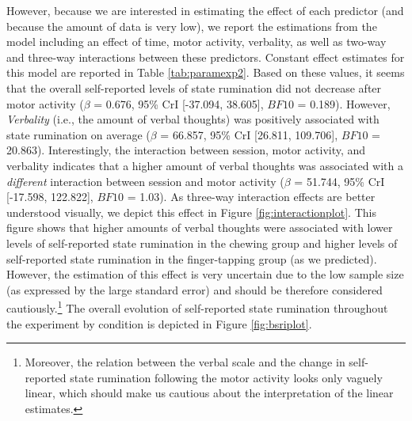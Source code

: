 \documentclass[a4paper,12pt,twoside,openright,oldfontcommands]{memoir}
\let\rmarkdownfootnote\footnote%
\def\footnote{\protect\rmarkdownfootnote}
\begin{document}
However, because we are interested in estimating the effect of each predictor (and because the amount of data is very low), we report the estimations from the model including an effect of time, motor activity, verbality, as well as two-way and three-way interactions between these predictors. Constant effect estimates for this model are reported in Table \ref{tab:paramexp2}. Based on these values, it seems that the overall self-reported levels of state rumination did not decrease after motor activity (\(\beta\) = 0.676, 95\% CrI {[}-37.094, 38.605{]}, \(BF10\) = 0.189). However, \emph{Verbality} (i.e., the amount of verbal thoughts) was positively associated with state rumination on average (\(\beta\) = 66.857, 95\% CrI {[}26.811, 109.706{]}, \(BF10\) = 20.863). Interestingly, the interaction between session, motor activity, and verbality indicates that a higher amount of verbal thoughts was associated with a \emph{different} interaction between session and motor activity (\(\beta\) = 51.744, 95\% CrI {[}-17.598, 122.822{]}, \(BF10\) = 1.03). As three-way interaction effects are better understood visually, we depict this effect in Figure \ref{fig:interactionplot}. This figure shows that higher amounts of verbal thoughts were associated with lower levels of self-reported state rumination in the chewing group and higher levels of self-reported state rumination in the finger-tapping group (as we predicted). However, the estimation of this effect is very uncertain due to the low sample size (as expressed by the large standard error) and should be therefore considered cautiously.\footnote{Moreover, the relation between the verbal scale and the change in self-reported state rumination following the motor activity looks only vaguely linear, which should make us cautious about the interpretation of the linear estimates.} The overall evolution of self-reported state rumination throughout the experiment by condition is depicted in Figure \ref{fig:bsriplot}.
\end{document}
